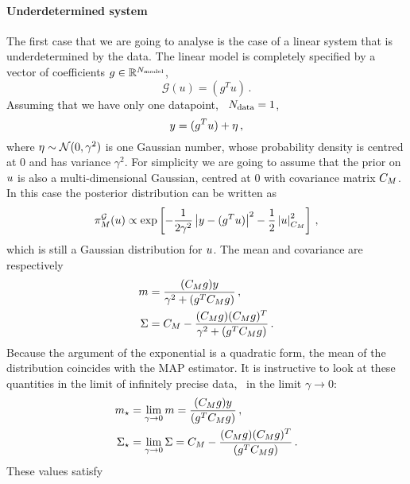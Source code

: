 \paragraph{Underdetermined system}
The first case that we are going to analyse is the case of a linear system that
is underdetermined by the data. The linear model is completely specified by a
vector of coefficients $g\in \mathbb{R}^{N_{\rm model}}$, 
\begin{equation}
  \label{eq:LinSyst}
  \mathcal{G}(u) = \left(g^T u\right)\, .
\end{equation}
Assuming that we have only one datapoint, \ie\ $N_{\rm data}=1$, 
\begin{equation}
  \label{eq:LinearModelEx}
  y = (g^T u) + \eta\, ,
\end{equation}
where $\eta \sim \mathcal{N}(0,\gamma^2)$ is one Gaussian number, whose
probability density is centred at $0$ and has variance $\gamma^2$. For
simplicity we are going to assume that the prior on $u$ is also a
multi-dimensional Gaussian, centred at $0$ with covariance matrix $C_M$. In
this case the posterior distribution can be written as
\begin{equation}
  \label{eq:GaussPostExplicit}
    \pi_M^{\mathcal{G}}(u) 
    \propto \exp \left[
      -\frac{1}{2\gamma^2} \left|y - (g^T u) \right|^2 - \frac12 \left|u\right|_{C_M}^2 
    \right]\, ,
\end{equation}
which is still a Gaussian distribution for $u$. The mean and covariance
are respectively
\begin{align}
  m &= \frac{(C_M g) y}{\gamma^2 + (g^T C_M g)}\, , \\
  \Sigma &= C_M - 
  \frac{(C_M g) (C_M g)^T}{\gamma^2 + (g^T C_M g)}\, .
\end{align}
Because the argument of the exponential is a quadratic form, the mean of the
distribution coincides with the MAP estimator. It is instructive to look at
these quantities in the limit of infinitely precise data, \ie\ in the limit
$\gamma\to 0$:
\begin{align}
  m_\star &= 
  \lim_{\gamma\to 0} m
  = \frac{(C_M g) y}{(g^T C_M g)}\, , \\
  \Sigma_\star &= 
  \lim_{\gamma\to 0} \Sigma 
  = C_M - 
  \frac{(C_M g) (C_M g)^T}{(g^T C_M g)}\, .
\end{align}
These values satisfy
